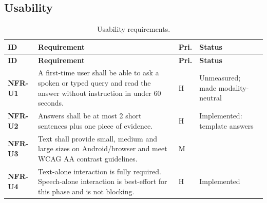 \subsection{Usability}
\begin{ltab}
\begin{longtable}{@{}>{\bfseries}L{1.6cm}L{8.6cm}L{0.7cm}L{3.8cm}@{}}
\caption{Usability requirements.}\\
\toprule
{}\textbf{ID} & \textbf{Requirement} & \textbf{Pri.} & \textbf{Status}\\
\midrule
\endfirsthead
\toprule
{}\textbf{ID} & \textbf{Requirement} & \textbf{Pri.} & \textbf{Status}\\
\midrule
\endhead
\bottomrule
\endfoot
NFR-U1 & A first-time user shall be able to ask a spoken or typed query and read the
answer without instruction in under 60 seconds. & H & Unmeasured; made modality-neutral\\
NFR-U2 & Answers shall be at most 2 short sentences plus one piece of
evidence. & H & Implemented: template answers\\
NFR-U3 & Text shall provide small, medium and large sizes on Android/browser and meet WCAG AA contrast guidelines. & M & \\
NFR-U4 & Text-alone interaction is fully required. Speech-alone interaction is best-effort for this phase and is not blocking. & H & Implemented\\
\end{longtable}
\end{ltab}

